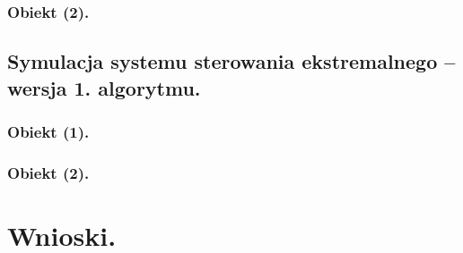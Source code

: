 \documentclass[a4paper,10pt]{article}
\begin{document}

\subsubsection{Obiekt (2).}
\subsection{Symulacja systemu sterowania ekstremalnego – wersja 1. algorytmu.}

\subsubsection{Obiekt (1).}

\subsubsection{Obiekt (2).}
\section{Wnioski.}\label{sec:wnioski}
\end{document}
